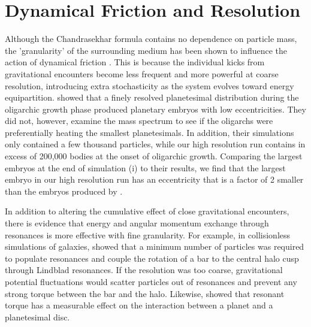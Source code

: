 \section{Dynamical Friction and Resolution} \label{sec:dynfric}

Although the Chandrasekhar formula \cite{chandraesekhar43} contains no dependence on particle mass, the 'granularity' of the 
surrounding medium has been shown to influence the action of dynamical friction \cite{brunini07}. This is because the individual 
kicks from gravitational encounters become less frequent and more powerful at coarse resolution, introducing extra stochasticity 
as the system evolves toward energy equipartition. \cite{obrien06} showed that a finely resolved planetesimal distribution during 
the oligarchic growth phase produced planetary embryos with low eccentricities. They did not, however, examine the mass 
spectrum to see if the oligarchs were preferentially heating the smallest planetesimals. In addition, their simulations only 
contained a few thousand particles, while our high resolution run contains in excess of 200,000 bodies at the onset of oligarchic 
growth. Comparing the largest embryos at the end of simulation (i) to their results, we find that the largest embryo in our high 
resolution run has an eccentricity that is a factor of 2 smaller than the embryos produced by \cite{obrien06}.

In addition to altering the cumulative effect of close gravitational encounters, there is evidence that energy and angular 
momentum exchange through resonances is more effective with fine granularity. For example, in collisionless simulations of 
galaxies, \cite{weinberg07a, weinberg07b} showed that a minimum number of particles was required to populate 
resonances and couple the rotation of a bar to the central halo cusp through Lindblad resonances. If the resolution was too 
coarse, gravitational potential fluctuations would scatter particles out of resonances and prevent any strong torque between the 
bar and the halo. Likewise, \cite{cionco02} showed that resonant torque has a measurable effect on the interaction between a 
planet and a planetesimal disc.


